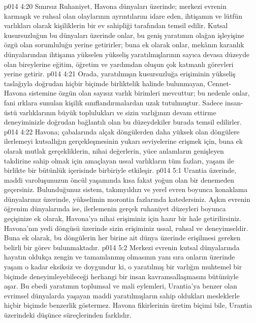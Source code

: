\vs p014 4:20 Sınırsız Ruhaniyet, Havona dünyaları üzerinde; merkezi evrenin karmaşık ve ruhsal olan olaylarının ayrıntılarını idare eden, ihtişamın ve lütfün varlıkları olarak kişiliklerin bir ev sahipliği tarafından temsil edilir. Kutsal kusursuzluğun bu dünyaları üzerinde onlar, bu geniş yaratımın olağan işleyişine özgü olan sorumluluğu yerine getirirler; buna ek olarak onlar, mekânın karanlık dünyalarından ihtişama yükselen yükseliş yaratılmışlarının sayıca devasa düzeyde olan bireylerine eğitim, öğretim ve yardımdan oluşun çok katmanlı görevleri yerine getirir.
\vs p014 4:21 Orada, yaratılmışın kusursuzluğa erişiminin yükseliş taslağıyla doğrudan hiçbir biçimde birliktelik halinde bulunmayan, Cennet\hyp{}Havona sistemine özgün olan sayısız varlık birimleri mevcuttur; bu nedenle onlar, fani ırklara sunulan kişilik sınıflandırmalardan uzak tutulmuştur. Sadece insan\hyp{}üstü varlıklarının büyük toplulukları ve sizin varlığınızı devam ettirme deneyiminizle doğrudan bağlantılı olan bu düzeydekiler burada temsil edilirler.
\vs p014 4:22 Havona; çabalarında alçak döngülerden daha yüksek olan döngülere ilerlemeyi kutsallığın gerçekleşmesinin yukarı seviyelerine erişmek için, buna ek olarak mutlak gerçekliklerin, nihai değerlerin, yüce anlamların genişleyen takdirine sahip olmak için amaçlayan ussal varlıkların tüm fazları, yaşam ile birlikte bir bütünlük içerisinde birbiriyle etkileşir.
\vs p014 5:1 Urantia üzerinde, maddi varoluşunuzun öncül yaşamında kısa fakat yoğun olan bir denemeden geçersiniz. Bulunduğunuz sistem, takımyıldızı ve yerel evren boyunca konaklama dünyalarınız üzerinde, yükselimin morontia fazlarında katedersiniz. Aşkın evrenin öğrenim dünyalarında ise, ilerlemenin gerçek ruhaniyet düzeyleri boyunca geçişinize ek olarak, Havona’ya nihai erişiminiz için hazır bir hale getirilirsiniz. Havona’nın yedi döngüsü üzerinde sizin erişiminiz ussal, ruhsal ve deneyimseldir. Buna ek olarak, bu döngülerin her birine ait dünya üzerinde erişilmesi gereken belirli bir görev bulunmaktadır.
\vs p014 5:2 Merkezi evrenin kutsal dünyalarında hayatın oldukça zengin ve tamamlanmış olmasının yanı sıra onların üzerinde yaşam o kadar eksiksiz ve doygundur ki, o yaratılmış bir varlığın muhtemel bir biçimde deneyimleyebileceği herhangi bir insan kavramsallaşmasını bütünüyle aşar. Bu ebedi yaratımın toplumsal ve mali eylemleri, Urantia’ya benzer olan evrimsel dünyalarda yaşayan maddi yaratılmışların sahip oldukları mesleklerle hiçbir biçimde benzerlik göstermez. Havona fikirlerinin üretim biçimi bile, Urantia üzerindeki düşünce süreçlerinden farklıdır.
